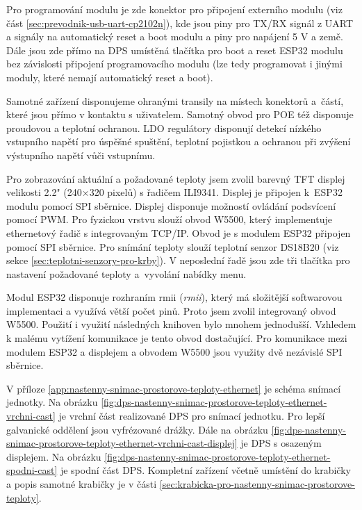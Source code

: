 Pro programování modulu je zde konektor pro připojení externího modulu (viz část \ref{sec:prevodnik-usb-uart-cp2102n}), kde jsou piny pro TX/RX signál z UART a signály na automatický reset a boot modulu a piny pro napájení 5 V a země. Dále jsou zde přímo na DPS umístěná tlačítka pro boot a reset ESP32 modulu bez závislosti připojení programovacího modulu (lze tedy programovat i jinými moduly, které nemají automatický reset a boot). 

Samotné zařízení disponujeme ohranými transily na místech konektorů a~částí, které jsou přímo v kontaktu s uživatelem. Samotný obvod pro POE též disponuje proudovou a teplotní ochranou. LDO regulátory disponují detekcí nízkého vstupního napětí pro úspěšné spuštění, teplotní pojistkou a ochranou při zvýšení výstupního napětí vůči vstupnímu. 

Pro zobrazování aktuální a požadované teploty jsem zvolil barevný TFT displej velikosti 2.2" (240×320 pixelů) s řadičem ILI9341. Displej je připojen k~ESP32 modulu pomocí SPI sběrnice. Displej disponuje možností ovládání podsvícení pomocí PWM. Pro fyzickou vrstvu slouží obvod W5500, který implementuje ethernetový řadič s integrovaným TCP/IP. Obvod je s modulem ESP32 připojen pomocí SPI sběrnice. Pro snímání teploty slouží teplotní senzor DS18B20 (viz sekce \ref{sec:teplotni-senzory-pro-krby}). V neposlední řadě jsou zde tři tlačítka pro nastavení požadované teploty a~vyvolání nabídky menu.

Modul ESP32 disponuje rozhraním \acrshort{rmii} (\textit{\acrlong{rmii}}), který má složitější softwarovou implementaci a využívá větší počet pinů. Proto jsem zvolil integrovaný obvod W5500. Použití i využití následných knihoven bylo mnohem jednodušší. Vzhledem k malému vytížení komunikace je tento obvod dostačující. Pro komunikace mezi modulem ESP32 a displejem a obvodem W5500 jsou využity dvě nezávislé SPI sběrnice. 

V příloze \ref{app:nastenny-snimac-prostorove-teploty-ethernet} je schéma snímací jednotky. Na obrázku \ref{fig:dps-nastenny-snimac-prostorove-teploty-ethernet-vrchni-cast} je vrchní část realizované DPS pro snímací jednotku. Pro lepší galvanické oddělení jsou vyfrézované drážky. Dále na obrázku \ref{fig:dps-nastenny-snimac-prostorove-teploty-ethernet-vrchni-cast-displej} je DPS s osazeným displejem. Na obrázku \ref{fig:dps-nastenny-snimac-prostorove-teploty-ethernet-spodni-cast} je spodní část DPS. Kompletní zařízení včetně umístění do krabičky a popis samotné krabičky je v části \ref{sec:krabicka-pro-nastenny-snimac-prostorove-teploty}.


